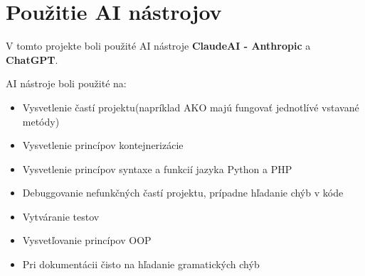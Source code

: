 \documentclass[a4paper, 11pt]{article}
\begin{document}
    \section{Použitie AI nástrojov}
        V tomto projekte boli použité AI nástroje \textbf{ClaudeAI - Anthropic} a \textbf{ChatGPT}.

        \noindent
        AI nástroje boli použité na:
        \begin{itemize}
            \item Vysvetlenie častí projektu(napríklad AKO majú fungovať jednotlívé vstavané metódy)
            \item Vysvetlenie princípov kontejnerizácie
            \item Vysvetlenie princípov syntaxe a funkcií jazyka Python a PHP
            \item Debuggovanie nefunkčných častí projektu, prípadne hľadanie chýb v kóde
            \item Vytváranie testov
            \item Vysvetľovanie princípov OOP 
            \item Pri dokumentácii čisto na hľadanie gramatických chýb
        \end{itemize}
        
\end{document}
